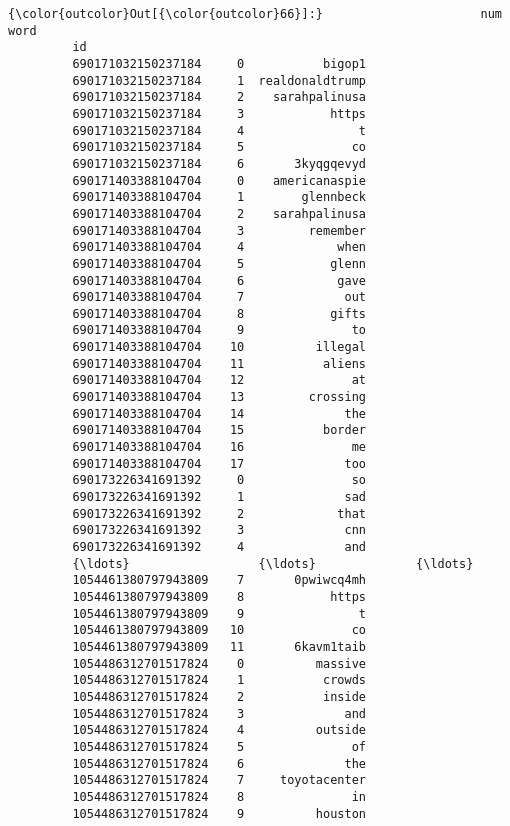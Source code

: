 \documentclass[11pt]{article}
\begin{document}
\begin{Verbatim}[commandchars=\\\{\}]
{\color{outcolor}Out[{\color{outcolor}66}]:}                      num             word
         id                                       
         690171032150237184     0           bigop1
         690171032150237184     1  realdonaldtrump
         690171032150237184     2    sarahpalinusa
         690171032150237184     3            https
         690171032150237184     4                t
         690171032150237184     5               co
         690171032150237184     6       3kyqgqevyd
         690171403388104704     0    americanaspie
         690171403388104704     1        glennbeck
         690171403388104704     2    sarahpalinusa
         690171403388104704     3         remember
         690171403388104704     4             when
         690171403388104704     5            glenn
         690171403388104704     6             gave
         690171403388104704     7              out
         690171403388104704     8            gifts
         690171403388104704     9               to
         690171403388104704    10          illegal
         690171403388104704    11           aliens
         690171403388104704    12               at
         690171403388104704    13         crossing
         690171403388104704    14              the
         690171403388104704    15           border
         690171403388104704    16               me
         690171403388104704    17              too
         690173226341691392     0               so
         690173226341691392     1              sad
         690173226341691392     2             that
         690173226341691392     3              cnn
         690173226341691392     4              and
         {\ldots}                  {\ldots}              {\ldots}
         1054461380797943809    7       0pwiwcq4mh
         1054461380797943809    8            https
         1054461380797943809    9                t
         1054461380797943809   10               co
         1054461380797943809   11       6kavm1taib
         1054486312701517824    0          massive
         1054486312701517824    1           crowds
         1054486312701517824    2           inside
         1054486312701517824    3              and
         1054486312701517824    4          outside
         1054486312701517824    5               of
         1054486312701517824    6              the
         1054486312701517824    7     toyotacenter
         1054486312701517824    8               in
         1054486312701517824    9          houston

\end{Verbatim}
\end{document}
